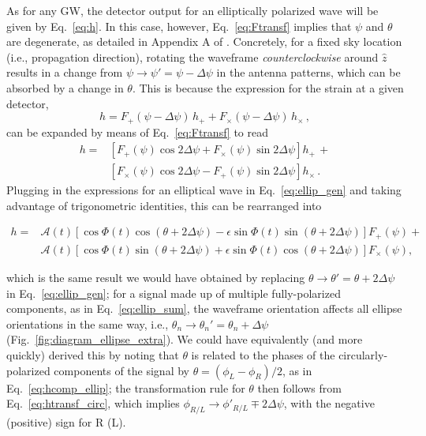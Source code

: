 \documentclass[aps,prd,twocolumn,superscriptaddress,preprintnumbers,floatfix,nofootinbib]{revtex4-2}
\newcommand{\beq}{\begin{equation}}
\newcommand{\eeq}{\end{equation}}
\newcommand*{\eq}[1]{Eq.~\eqref{eq:#1}}
\begin{document}
As for any GW, the detector output for an elliptically polarized wave will be given by \eq{h}.
In this case, however, \eq{Ftransf} implies that $\psi$ and $\theta$ are degenerate, as detailed in Appendix A of \cite{Isi:2017equ}.
Concretely, for a fixed sky location (i.e., propagation direction), rotating the waveframe \emph{counterclockwise} around $\hat{z}$ results in a change from $\psi \to \psi' = \psi - \Delta\psi$ in the antenna patterns, which can be absorbed by a change in $\theta$.
This is because the expression for the strain at a given detector,
\beq
h = F_+(\psi - \Delta \psi)\, h_+ + F_\times(\psi - \Delta \psi)\, h_\times \, ,
\eeq
can be expanded by means of \eq{Ftransf} to read
\begin{align}
h = &\left[ F_+(\psi) \cos 2\Delta\psi + F_\times(\psi) \sin 2\Delta\psi \right] h_+\, + \nonumber \\
 &\left[F_\times(\psi) \cos 2\Delta\psi - F_+(\psi)\sin 2\Delta\psi\right] h_\times \, .
\end{align}
Plugging in the expressions for an elliptical wave in \eq{ellip_gen} and taking advantage of trigonometric identities, this can be rearranged into
\begin{widetext}
\begin{align} \label{eq:theta_psi}
h = & \mathcal{A}(t) \left[\cos \Phi(t) \cos(\theta + 2\Delta\psi) -  \epsilon \sin \Phi(t)\sin(\theta + 2\Delta\psi) \right] F_+(\psi) +\nonumber\\
&\mathcal{A}(t) \left[\cos \Phi(t) \sin(\theta + 2\Delta\psi) + \epsilon \sin \Phi(t) \cos(\theta + 2\Delta\psi) \right] F_\times(\psi), 
\end{align}
\end{widetext}
which is the same result we would have obtained by replacing $\theta \to \theta' = \theta + 2 \Delta\psi$ in \eq{ellip_gen};
for a signal made up of multiple fully-polarized components, as in \eq{ellip_sum}, the waveframe orientation affects all ellipse orientations in the same way, i.e., $\theta_n \to \theta_n'=\theta_n + \Delta\psi$ (Fig.~\ref{fig:diagram_ellipse_extra}).
We could have equivalently (and more quickly) derived this by noting that $\theta$ is related to the phases of the circularly-polarized components of the signal by $\theta = \left(\phi_L - \phi_R\right)/2$, as in \eq{hcomp_ellip}; the transformation rule for $\theta$ then follows from \eq{htransf_circ}, which implies $\phi_{R/L} \to \phi'_{R/L} \mp 2\Delta\psi$, with the negative (positive) sign for R (L).
\end{document}
